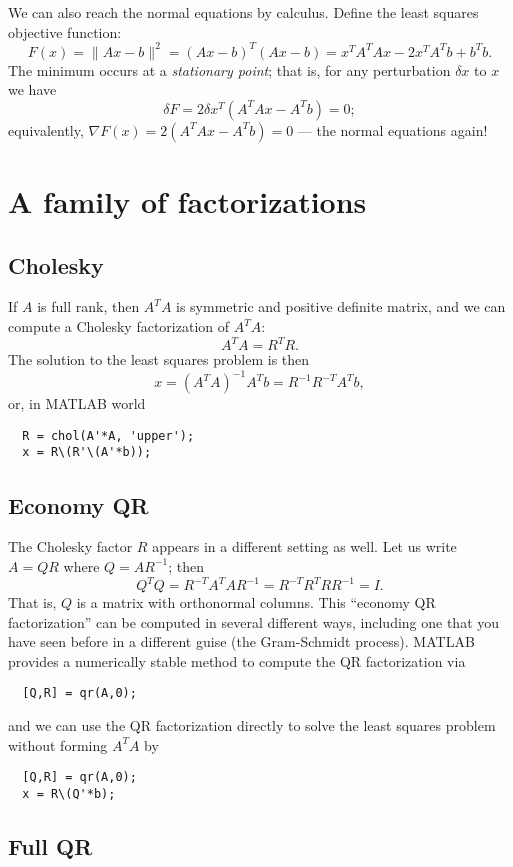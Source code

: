 \documentclass[12pt, leqno]{article}
\begin{document}
We can also reach the normal equations by calculus.  Define
the least squares objective function:
\[
  F(x) = \|Ax-b\|^2 = (Ax-b)^T (Ax-b) = x^T A^TA x - 2x^T A^T b + b^T b.
\]
The minimum occurs at a {\em stationary point}; that is,
for any perturbation $\delta x$ to $x$ we have
\[
  \delta F = 2 \delta x^T (A^T A x - A^T b) = 0;
\]
equivalently, $\nabla F(x) = 2 (A^T A x - A^T b) = 0$ ---
the normal equations again!

\section*{A family of factorizations}

\subsection*{Cholesky}

If $A$ is full rank, then $A^T A$ is symmetric and positive definite
matrix, and we can compute a Cholesky factorization of $A^T A$:
\[
  A^T A = R^T R.
\]
The solution to the least squares problem is then
\[
  x = (A^T A)^{-1} A^T b = R^{-1} R^{-T} A^T b,
\]
or, in MATLAB world
\begin{lstlisting}
  R = chol(A'*A, 'upper');
  x = R\(R'\(A'*b));
\end{lstlisting}

\subsection*{Economy QR}

The Cholesky factor $R$ appears in a different setting as well.
Let us write $A = QR$ where $Q = AR^{-1}$; then
\[
  Q^T Q = R^{-T} A^T A R^{-1} = R^{-T} R^T R R^{-1} = I.
\]
That is, $Q$ is a matrix with orthonormal columns.  This
``economy QR factorization'' can be computed in several different
ways, including one that you have seen before in a different guise
(the Gram-Schmidt process).  MATLAB provides a numerically stable
method to compute the QR factorization via
\begin{lstlisting}
  [Q,R] = qr(A,0);
\end{lstlisting}
and we can use the QR factorization directly to solve the least
squares problem without forming $A^T A$ by
\begin{lstlisting}
  [Q,R] = qr(A,0);
  x = R\(Q'*b);
\end{lstlisting}

\subsection*{Full QR}
\end{document}
